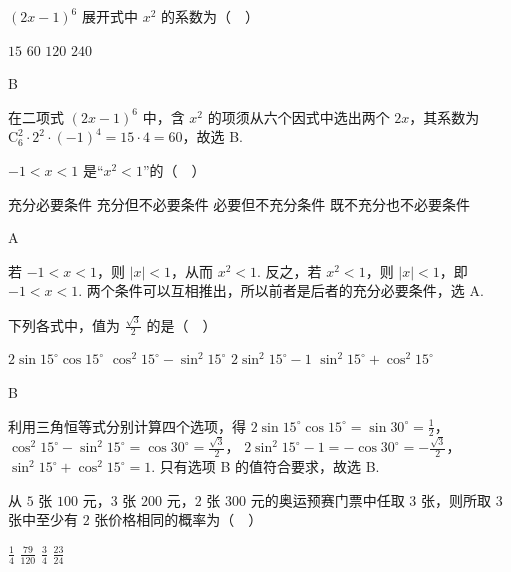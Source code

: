 \begin{problem}
\((2x - 1)^{6}\) 展开式中 \(x^{2}\) 的系数为（\(\quad\)）

\choices
    {\(15\)}
    {\(60\)}
    {\(120\)}
    {\(240\)}
\end{problem}

\begin{answer}
B
\end{answer}

\begin{solution}
在二项式 \((2x-1)^6\) 中，含 \(x^2\) 的项须从六个因式中选出两个 \(2x\)，其系数为 \(\mathrm C_6^2\cdot 2^2\cdot(-1)^4=15\cdot4=60\)，故选 B.
\end{solution}

\begin{problem}
\(-1 < x < 1\) 是“\(x^2 < 1\)”的（\(\quad\)）

\choices
    {充分必要条件}
    {充分但不必要条件}
    {必要但不充分条件}
    {既不充分也不必要条件}
\end{problem}

\begin{answer}
A
\end{answer}

\begin{solution}
若 \(-1<x<1\)，则 \(|x|<1\)，从而 \(x^2<1\). 反之，若 \(x^2<1\)，则 \(|x|<1\)，即 \(-1<x<1\). 两个条件可以互相推出，所以前者是后者的充分必要条件，选 A.
\end{solution}

\begin{problem}
下列各式中，值为 \(\frac{\sqrt{3}}{2}\) 的是（\(\quad\)）

\choices
    {\(2\sin 15^{\circ}\cos 15^{\circ}\)}
    {\(\cos^2 15^\circ -\sin^2 15^\circ\)}
    {\(2\sin^{2}15^{\circ} - 1\)}
    {\(\sin^2 15^\circ +\cos^2 15^\circ\)}
\end{problem}

\begin{answer}
B
\end{answer}

\begin{solution}
利用三角恒等式分别计算四个选项，得
\(2\sin15^{\circ}\cos15^{\circ}=\sin30^{\circ}=\frac12\)，
\(\cos^2 15^{\circ}-\sin^2 15^{\circ}=\cos30^{\circ}=\frac{\sqrt3}{2}\)，
\(2\sin^2 15^{\circ}-1=-\cos30^{\circ}=-\frac{\sqrt3}{2}\)，
\(\sin^2 15^{\circ}+\cos^2 15^{\circ}=1\). 只有选项 B 的值符合要求，故选 B.
\end{solution}

\begin{problem}
从 \(5\) 张 \(100\) 元，\(3\) 张 \(200\) 元，\(2\) 张 \(300\) 元的奥运预赛门票中任取 \(3\) 张，则所取 \(3\) 张中至少有 \(2\) 张价格相同的概率为（\(\quad\)）

\choices
    {\( \frac{1}{4} \)}
    {\(\frac{79}{120}\)}
    {\( \frac{3}{4} \)}
    {\(\frac{23}{24}\)}
\end{problem}

